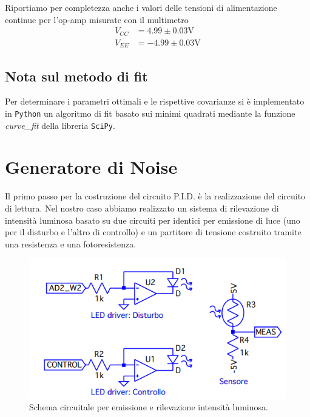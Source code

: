 \documentclass[10pt, a4paper, italian]{article}
\begin{document}
Riportiamo per completezza anche i valori delle tensioni di alimentazione
continue per l'op-amp misurate con il multimetro
\begin{align*}
V_{CC} &= 4.99 \pm 0.03 \si{\V} \\
V_{EE} &= -4.99 \pm 0.03 \si{\V}
\end{align*}


\subsection*{Nota sul metodo di fit}
Per determinare i parametri ottimali e le rispettive covarianze si \`e
implementato in \verb+Python+ un algoritmo di fit basato sui minimi quadrati
mediante la funzione \emph{curve\_fit} della libreria \texttt{SciPy}.

\section{Generatore di Noise}
Il primo passo per la costruzione del circuito P.I.D. è la realizzazione del circuito di lettura. Nel nostro caso abbiamo realizzato un sistema di rilevazione di intensità luminosa basato su due circuiti per identici per emissione di luce (uno per il disturbo e l'altro di controllo) e un partitore di tensione costruito tramite una resistenza e una fotoresistenza.
\begin{figure}[H]
    \centering
	\includegraphics[scale=0.3]{noisegen}
    \caption{Schema circuitale per emissione e rilevazione intensità luminosa.
    \label{fig: Draft1}}
\end{figure}
\end{document}
